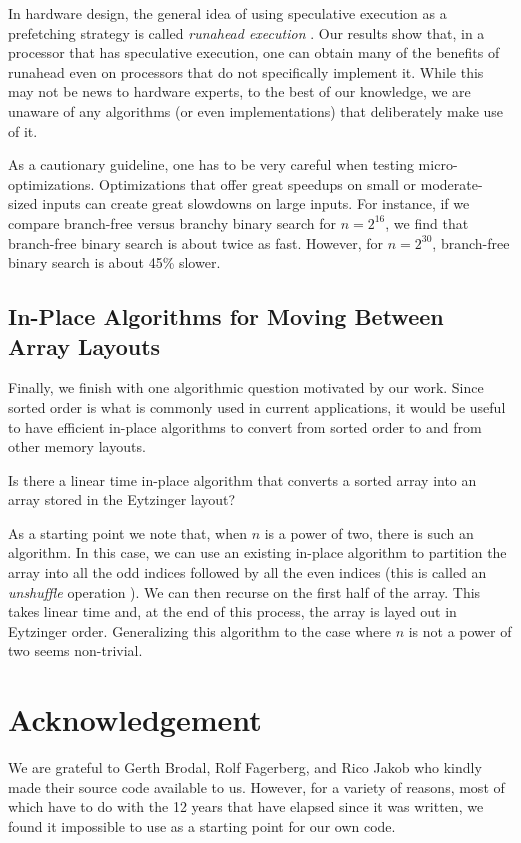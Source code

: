 \documentclass{patmorin}
\begin{document}
In hardware design, the general idea of using speculative execution
as a prefetching strategy is called \emph{runahead execution}
\cite{mutlu.stark.ea:runahead}.  Our results show that, in a processor
that has speculative execution, one can obtain many of the benefits
of runahead even on processors that do not specifically implement it.
While this may not be news to hardware experts, to the best of our
knowledge, we are unaware of any algorithms (or even implementations)
that deliberately make  use of it.

As a cautionary guideline, one has to be very careful when testing
micro-optimizations.  Optimizations that offer great speedups on small
or moderate-sized inputs can create great slowdowns on large inputs.
For instance, if we compare branch-free versus branchy binary search for
$n=2^{16}$, we find that branch-free binary search is about twice as fast.
However, for $n=2^{30}$, branch-free binary search is about 45\% slower.

\subsection{In-Place Algorithms for Moving Between Array Layouts}

Finally, we finish with one algorithmic question motivated by our work.
Since sorted order is what is commonly used in current applications,
it would be useful to have efficient in-place algorithms to convert from
sorted order to and from other memory layouts.

\begin{op}
  Is there a linear time in-place algorithm that converts a sorted array
  into an array stored in the Eytzinger layout?
\end{op}

As a starting point we note that, when $n$ is a power of two, there
is such an algorithm.  In this case, we can use an existing in-place
algorithm to partition the array into all the odd indices followed
by all the even indices (this is called an \emph{unshuffle} operation
\cite[Section~7]{ellis.markov:in-situ}). We can then recurse on the first
half of the array. This takes linear time and, at the end of this process,
the array is layed out in Eytzinger order.  Generalizing this algorithm
to the case where $n$ is not a power of two seems non-trivial.

\section*{Acknowledgement}

We are grateful to  Gerth Brodal, Rolf Fagerberg, and Rico Jakob who
kindly made their source code available to us. However, for a variety
of reasons, most of which have to do with the 12 years that have elapsed
since it was written, we found it impossible to use as a starting point
for our own code.




\end{document}
